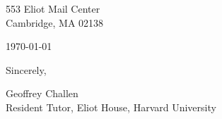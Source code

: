 

\def\shorttitle{Short Title}
\def\shortauthors{Geoffrey Challen}


\pagestyle{letter}

553 Eliot Mail Center\\
Cambridge, MA 02138

\vspace*{0.1in}

\today

\vspace*{0.1in}



Sincerely,

\vspace*{0.5in}

Geoffrey Challen\\
Resident Tutor, Eliot House, Harvard University


